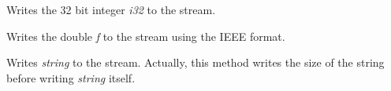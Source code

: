 

Writes the 32 bit integer {\it i32} to the stream.



Writes the double {\it f} to the stream using the IEEE format.



Writes {\it string} to the stream. Actually, this method writes the size of
the string before writing {\it string} itself.

